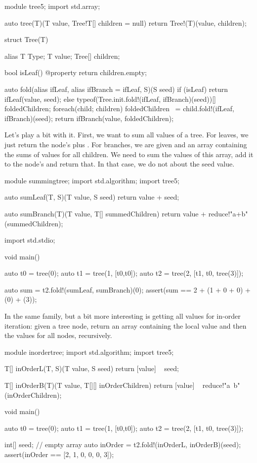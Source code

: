 \begin{dcode}
module tree5;
import std.array;

auto tree(T)(T value, Tree!T[] children = null) 
{
    return Tree!(T)(value, children);
}

struct Tree(T)
{
    alias T Type;
    T value;
    Tree[] children;

    bool isLeaf() @property { return children.empty;}

    auto fold(alias ifLeaf, alias ifBranch = ifLeaf, S)(S seed)
    {
        if (isLeaf)
        {
            return ifLeaf(value, seed);
        }
        else
        {
            typeof(Tree.init.fold!(ifLeaf, ifBranch)(seed))[] foldedChildren;
            foreach(child; children) 
                foldedChildren ~= child.fold!(ifLeaf, ifBranch)(seed);
            return ifBranch(value, foldedChildren);
        }
    }
}
\end{dcode}

Let's play a bit with it. First, we want to sum all values of a tree. For leaves, we just return the node's  plus . For branches, we are given  and an array containing the sums of values for all children. We need to sum the values of this array, add it to the node's  and return that. In that case, we do not about the seed value.

\begin{dcode}
module summingtree;
import std.algorithm;
import tree5;

auto sumLeaf(T, S)(T value, S seed)
{
    return value + seed;
}

auto sumBranch(T)(T value, T[] summedChildren)
{
    return value + reduce!"a+b"(summedChildren);
}

import std.stdio;

void main()
{
    auto t0 = tree(0);
    auto t1 = tree(1, [t0,t0]);
    auto t2 = tree(2, [t1, t0, tree(3)]);

    auto sum = t2.fold!(sumLeaf, sumBranch)(0);
    assert(sum == 2 + (1 + 0 + 0) + (0) + (3));
}
\end{dcode}

In the same family, but a bit more interesting is getting all values for in-order iteration: given a tree node, return an array containing the local value and then the values for all nodes, recursively.

\begin{dcode}
module inordertree;
import std.algorithm;
import tree5;

T[] inOrderL(T, S)(T value, S seed)
{
    return [value] ~ seed;
}

T[] inOrderB(T)(T value, T[][] inOrderChildren)
{
    return [value] ~ reduce!"a~b"(inOrderChildren);
}

void main()
{
    auto t0 = tree(0);
    auto t1 = tree(1, [t0,t0]);
    auto t2 = tree(2, [t1, t0, tree(3)]);

    int[] seed; // empty array
    auto inOrder = t2.fold!(inOrderL, inOrderB)(seed);
    assert(inOrder == [2, 1, 0, 0, 0, 3]);
}
\end{dcode}

